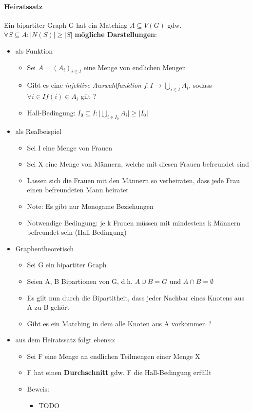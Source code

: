 \documentclass[12pt,a4paper]{article}
\begin{document}
\paragraph{Heiratssatz}
\flushleft
Ein bipartiter Graph G hat ein Matching $A\subseteq V(G)$ gdw. $\forall S \subseteq A: \vert N(S) \vert \geq \vert S \vert$
\textbf{mögliche Darstellungen}:
\begin{itemize}
\item als Funktion
\begin{itemize}
\item Sei $A = (A_i)_{i\in I}$ eine Menge von endlichen Mengen
\item Gibt es eine \textit{injektive Auswahlfunktion} $\displaystyle f: I \rightarrow \bigcup_{i\in I} A_i$, sodass $\forall i \in I f(i) \in A_i$ gilt ?
\item Hall-Bedingung: $\displaystyle I_0 \subseteq I : \bigl\vert \bigcup_{i\in I_0} A_i \bigl\vert \geq \vert I_0 \vert$
\end{itemize}
\item als Realbeispiel
\begin{itemize}
\item Sei I eine Menge von Frauen
\item Sei X eine Menge von Männern, welche mit diesen Frauen befreundet sind
\item Lassen sich die Frauen mit den Männern so verheiraten, dass jede Frau einen befreundeten Mann heiratet
\item Note: Es gibt nur Monogame Beziehungen
\item Notwendige Bedingung: je k Frauen müssen mit mindestens k Männern befreundet sein (Hall-Bedingung)
\end{itemize}
\item Graphentheoretisch
\begin{itemize}
\item Sei G ein bipartiter Graph
\item Seien A, B Bipartionen von G, d.h. $A \cup B = G$ und $A \cap B = \emptyset$
\item Es gilt nun durch die Bipartitheit, dass jeder Nachbar eines Knotens aus A zu B gehört
\item Gibt es ein Matching in dem alle Knoten aus A vorkommen ?
\end{itemize}
\item aus dem Heiratssatz folgt ebenso:
\begin{itemize}
\item Sei F eine Menge an endlichen Teilmengen einer Menge X
\item F hat einen \textbf{Durchschnitt} gdw. F die Hall-Bedingung erfüllt
\item Beweis:
\begin{itemize}
\item TODO
\end{itemize}
\end{itemize}
\end{itemize}
\end{document}
